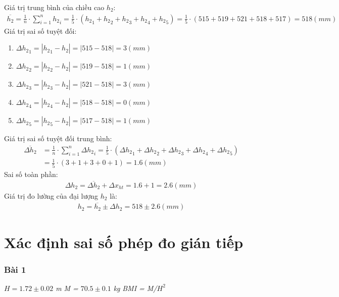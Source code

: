 \documentclass{article}
\begin{document}
Giá trị trung bình của chiều cao $h_2$:
\begin{align*}
    \overline{h_2} = \frac{1}{n}\cdot\sum_{i = 1}^{n}{h_2}_i = \frac{1}{5}\cdot({h_2}_1 + {h_2}_2 + {h_2}_3 + {h_2}_4 + {h_2}_5) = \frac{1}{5}\cdot(515 + 519 + 521 + 518 + 517) = 518(mm)
\end{align*}
Giá trị sai số tuyệt đối:
\begin{enumerate}
    \item $\Delta {h_2}_1 = |{h_2}_1 - h_2| = |515 - 518| = 3(mm)$
    \item $\Delta {h_2}_2 = |{h_2}_2 - h_2| = |519 - 518| = 1(mm)$
    \item $\Delta {h_2}_3 = |{h_2}_3 - h_2| = |521 - 518| = 3(mm)$
    \item $\Delta {h_2}_4 = |{h_2}_4 - h_2| = |518 - 518| = 0(mm)$
    \item $\Delta {h_2}_5 = |{h_2}_5 - h_2| = |517 - 518| = 1(mm)$
\end{enumerate}
Giá trị sai số tuyệt đối trung bình:
\begin{align*}
    \overline{\Delta h_2} &= \frac{1}{n}\cdot\sum_{i=1}^{n}\Delta {h_2}_i = \frac{1}{5}\cdot(\Delta {h_2}_1 + \Delta {h_2}_2 + \Delta {h_2}_3 + \Delta {h_2}_4 + \Delta {h_2}_5)\\ 
    &=  \frac{1}{5}\cdot(3 + 1 + 3 + 0 + 1) = 1.6(mm)
\end{align*}
Sai số toàn phần:
\begin{align*}
    \Delta h_2 = \overline{\Delta h_2} + \Delta x_{ht} =1.6 + 1 =2.6(mm) 
\end{align*}
Giá trị đo lường của đại lượng $h_2$ là:
\begin{align*}
    h_2 = \overline{h_2} \pm \Delta h_2 = 518 \pm 2.6(mm)
\end{align*}



\section*{Xác định sai số phép đo gián tiếp}
\subsubsection*{Bài 1}
\textit{$H = 1.72 \pm 0.02$ m} \textit{M = $70.5 \pm 0.1$ kg} \textit{BMI = M/$H^2$}\\
\end{document}
